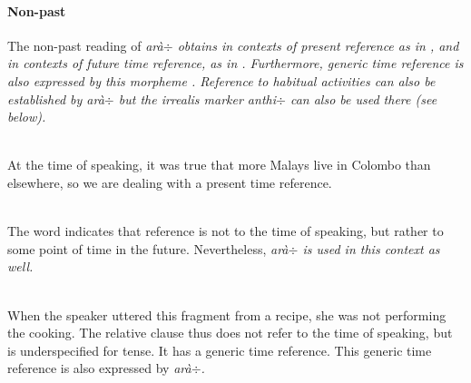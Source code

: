 \paragraph{Non-past}

The non-past reading of \em arà$\div$ \em obtains in contexts of present reference as in , and in contexts of future time reference, as in . Furthermore, generic time reference is also expressed by this morpheme . Reference to habitual activities can also be established by \em arà$\div$ \em{} but the irrealis marker \em anthi$\div$ \em  can also be used there (see below).

\\ 

At the time of speaking, it was true that more Malays live in Colombo than elsewhere, so we are dealing with a present time reference.

\\ 

The word  indicates that reference is not to the time of speaking, but rather to some point of time in the future. Nevertheless, \em arà$\div$  \em is used in this context as well.

\\ 

When the speaker uttered this fragment from a recipe, she was not performing the cooking. The relative clause thus does not refer to the time of speaking, but is underspecified for tense. It has a generic time reference. This generic time reference is also expressed by \em arà$\div$\em.





